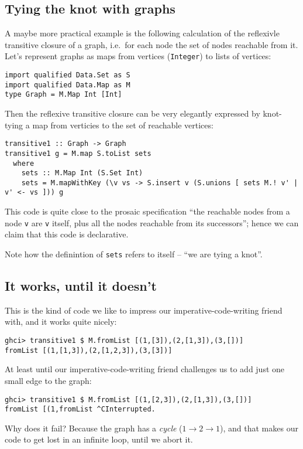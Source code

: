 \documentclass[manuscript,screen,acmsmall]{acmart}
\begin{document}
\subsection{Tying the knot with graphs}

A maybe more practical example is the following calculation of the reflexivle transitive closure of a graph, i.e.\ for each node the set of nodes reachable from it. Let's represent graphs as maps from vertices (\verb|Integer|) to lists of vertices:
\begin{verbatim}
import qualified Data.Set as S
import qualified Data.Map as M
type Graph = M.Map Int [Int]
\end{verbatim}

Then the reflexive transitive closure can be very elegantly expressed by knot-tying a map from verticies to the set of reachable vertices:
\begin{verbatim}
transitive1 :: Graph -> Graph
transitive1 g = M.map S.toList sets
  where
    sets :: M.Map Int (S.Set Int)
    sets = M.mapWithKey (\v vs -> S.insert v (S.unions [ sets M.! v' | v' <- vs ])) g
\end{verbatim}
This code is quite close to the prosaic specification “the reachable nodes from a node \verb|v| are \verb|v| itself, plus all the nodes reachable from its successors”; hence we can claim that this code is declarative.

Note how the definintion of \verb|sets| refers to itself -- “we are tying a knot”.

\subsection{It works, until it doesn't}

This is the kind of code we like to impress our imperative-code-writing friend with, and it works quite nicely:
\begin{verbatim}
ghci> transitive1 $ M.fromList [(1,[3]),(2,[1,3]),(3,[])]
fromList [(1,[1,3]),(2,[1,2,3]),(3,[3])]
\end{verbatim}

At least until our imperative-code-writing friend challenges us to add just one small edge to the graph:
\begin{verbatim}
ghci> transitive1 $ M.fromList [(1,[2,3]),(2,[1,3]),(3,[])]
fromList [(1,fromList ^CInterrupted.
\end{verbatim}
Why does it fail? Because the graph has a \emph{cycle} ($1 \to 2 \to 1$), and that makes our code to get lost in an infinite loop, until we abort it.
\end{document}
